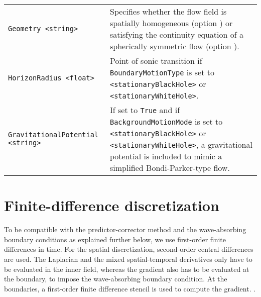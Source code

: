 \begin{longtable}{p{} p{}}
{\tt Geometry <string>} & Specifies whether the flow field is spatially homogeneous (option {\tt <1dCartesian>}) or satisfying the continuity equation of a spherically symmetric flow (option {\tt <3dSphericallySymmetric>}). \\
{\tt HorizonRadius <float>} & Point of sonic transition if {\tt BoundaryMotionType} is set to {\tt <stationaryBlackHole>} or {\tt <stationaryWhiteHole>}. \\
{\tt GravitationalPotential <string>} & If set to {\tt True} and if {\tt BackgroundMotionMode} is set to {\tt <stationaryBlackHole>} or {\tt <stationaryWhiteHole>}, a gravitational potential is included to mimic a simplified Bondi-Parker-type flow. \\
 \hline
\end{longtable} \vspace{1em}


\section{Finite-difference discretization}
\label{sec:Finite difference discretization}

To be compatible with the predictor-corrector method and the wave-absorbing boundary conditions as explained further below, we use first-order finite differences in time. For the spatial discretization, second-order central differences are used. The Laplacian and the mixed spatial-temporal derivatives only have to be evaluated in the inner field, whereas the gradient also has to be evaluated at the boundary, to impose the wave-absorbing boundary condition. At the boundaries, a first-order finite difference stencil is used to compute the gradient. .

